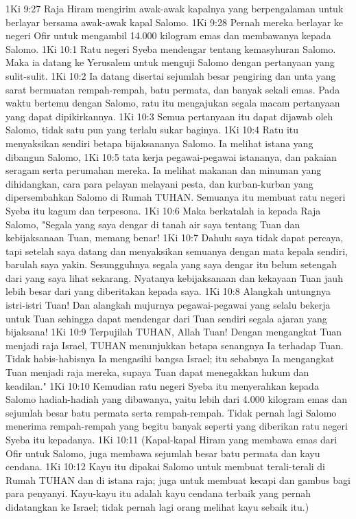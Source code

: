 1Ki 9:27  Raja Hiram mengirim awak-awak kapalnya yang berpengalaman untuk berlayar bersama awak-awak kapal Salomo.
1Ki 9:28  Pernah mereka berlayar ke negeri Ofir untuk mengambil 14.000 kilogram emas dan membawanya kepada Salomo.
1Ki 10:1  Ratu negeri Syeba mendengar tentang kemasyhuran Salomo. Maka ia datang ke Yerusalem untuk menguji Salomo dengan pertanyaan yang sulit-sulit.
1Ki 10:2  Ia datang disertai sejumlah besar pengiring dan unta yang sarat bermuatan rempah-rempah, batu permata, dan banyak sekali emas. Pada waktu bertemu dengan Salomo, ratu itu mengajukan segala macam pertanyaan yang dapat dipikirkannya.
1Ki 10:3  Semua pertanyaan itu dapat dijawab oleh Salomo, tidak satu pun yang terlalu sukar baginya.
1Ki 10:4  Ratu itu menyaksikan sendiri betapa bijaksananya Salomo. Ia melihat istana yang dibangun Salomo,
1Ki 10:5  tata kerja pegawai-pegawai istananya, dan pakaian seragam serta perumahan mereka. Ia melihat makanan dan minuman yang dihidangkan, cara para pelayan melayani pesta, dan kurban-kurban yang dipersembahkan Salomo di Rumah TUHAN. Semuanya itu membuat ratu negeri Syeba itu kagum dan terpesona.
1Ki 10:6  Maka berkatalah ia kepada Raja Salomo, "Segala yang saya dengar di tanah air saya tentang Tuan dan kebijaksanaan Tuan, memang benar!
1Ki 10:7  Dahulu saya tidak dapat percaya, tapi setelah saya datang dan menyaksikan semuanya dengan mata kepala sendiri, barulah saya yakin. Sesungguhnya segala yang saya dengar itu belum setengah dari yang saya lihat sekarang. Nyatanya kebijaksanaan dan kekayaan Tuan jauh lebih besar dari yang diberitakan kepada saya.
1Ki 10:8  Alangkah untungnya istri-istri Tuan! Dan alangkah mujurnya pegawai-pegawai yang selalu bekerja untuk Tuan sehingga dapat mendengar dari Tuan sendiri segala ajaran yang bijaksana!
1Ki 10:9  Terpujilah TUHAN, Allah Tuan! Dengan mengangkat Tuan menjadi raja Israel, TUHAN menunjukkan betapa senangnya Ia terhadap Tuan. Tidak habis-habisnya Ia mengasihi bangsa Israel; itu sebabnya Ia mengangkat Tuan menjadi raja mereka, supaya Tuan dapat menegakkan hukum dan keadilan."
1Ki 10:10  Kemudian ratu negeri Syeba itu menyerahkan kepada Salomo hadiah-hadiah yang dibawanya, yaitu lebih dari 4.000 kilogram emas dan sejumlah besar batu permata serta rempah-rempah. Tidak pernah lagi Salomo menerima rempah-rempah yang begitu banyak seperti yang diberikan ratu negeri Syeba itu kepadanya.
1Ki 10:11  (Kapal-kapal Hiram yang membawa emas dari Ofir untuk Salomo, juga membawa sejumlah besar batu permata dan kayu cendana.
1Ki 10:12  Kayu itu dipakai Salomo untuk membuat terali-terali di Rumah TUHAN dan di istana raja; juga untuk membuat kecapi dan gambus bagi para penyanyi. Kayu-kayu itu adalah kayu cendana terbaik yang pernah didatangkan ke Israel; tidak pernah lagi orang melihat kayu sebaik itu.)
